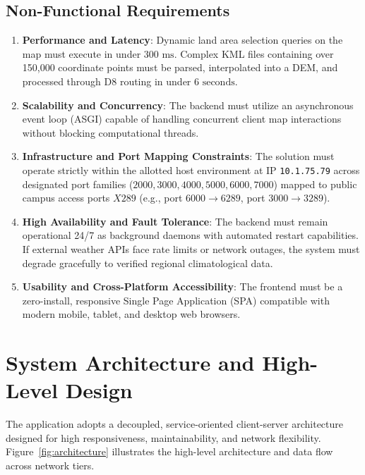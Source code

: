 \documentclass[manuscript,screen,nonacm]{acmart}
\begin{document}
\subsection{Non-Functional Requirements}
\begin{enumerate}
    \item \textbf{Performance and Latency}: Dynamic land area selection queries on the map must execute in under $300\text{ ms}$. Complex KML files containing over 150,000 coordinate points must be parsed, interpolated into a DEM, and processed through D8 routing in under $6\text{ seconds}$.
    \item \textbf{Scalability and Concurrency}: The backend must utilize an asynchronous event loop (ASGI) capable of handling concurrent client map interactions without blocking computational threads.
    \item \textbf{Infrastructure and Port Mapping Constraints}: The solution must operate strictly within the allotted host environment at IP \texttt{10.1.75.79} across designated port families ($2000, 3000, 4000, 5000, 6000, 7000$) mapped to public campus access ports $X289$ (e.g., port $6000 \to 6289$, port $3000 \to 3289$).
    \item \textbf{High Availability and Fault Tolerance}: The backend must remain operational 24/7 as background daemons with automated restart capabilities. If external weather APIs face rate limits or network outages, the system must degrade gracefully to verified regional climatological data.
    \item \textbf{Usability and Cross-Platform Accessibility}: The frontend must be a zero-install, responsive Single Page Application (SPA) compatible with modern mobile, tablet, and desktop web browsers.
\end{enumerate}

\section{System Architecture and High-Level Design}
\label{sec:architecture}
The application adopts a decoupled, service-oriented client-server architecture designed for high responsiveness, maintainability, and network flexibility. Figure~\ref{fig:architecture} illustrates the high-level architecture and data flow across network tiers.
\end{document}

